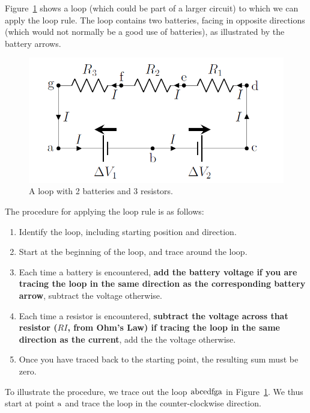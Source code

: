 Figure~\ref{fig:circuits:loop} shows a loop (which could be part of a larger circuit) to which we can apply the loop rule. The loop contains two batteries, facing in opposite directions (which would not normally be a good use of batteries), as illustrated by the battery arrows.

\begin{figure}[!htbp]
\centering
\includegraphics[width=0.55\linewidth]{files/loop-ad77847ada097ce589459094edc79d1b.png}
\caption[]{A loop with 2 batteries and 3 resistors.}
\label{fig:circuits:loop}
\end{figure}

The procedure for applying the loop rule is as follows:

\begin{enumerate}
\item Identify the loop, including starting position and direction.
\item Start at the beginning of the loop, and trace around the loop.
\item Each time a battery is encountered, \textbf{add the battery voltage if you are tracing the loop in the same direction as the corresponding battery arrow}, subtract the voltage otherwise.
\item Each time a resistor is encountered, \textbf{subtract the voltage across that resistor ($RI$, from Ohm's Law) if tracing the loop in the same direction as the current}, add the the voltage otherwise.
\item Once you have traced back to the starting point, the resulting sum must be zero.
\end{enumerate}

To illustrate the procedure, we trace out the loop ${\rm abcedfga}$ in Figure~\ref{fig:circuits:loop}. We thus start at point ${\rm a}$ and trace the loop in the counter-clockwise direction.

